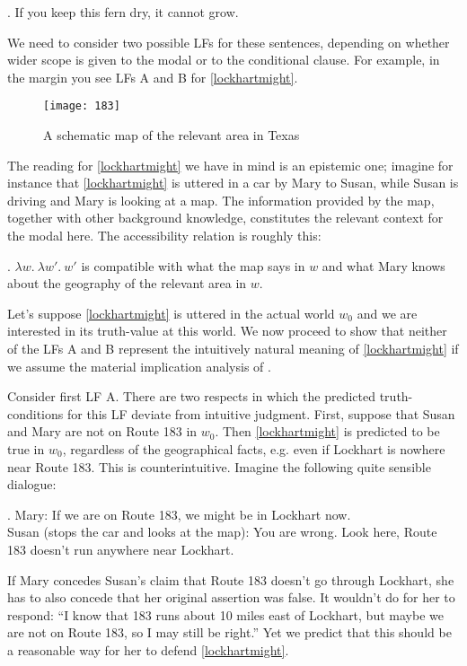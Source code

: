 \ex. \label{fern}If you keep this fern dry, it cannot grow.

We need to consider two possible LFs for these sentences, depending on whether wider scope is given to the modal or to the conditional clause. For example, in the margin you see LFs A and B for \ref{lockhartmight}.

\begin{wrapfigure}{l}{40mm}
  \begin{center}
    \texttt{[image: 183]}
  \end{center}
  \caption{A schematic map of the relevant area in Texas}
\end{wrapfigure}
%
The reading for \ref{lockhartmight} we have in mind is an epistemic one; imagine for instance that \ref{lockhartmight} is uttered in a car by Mary to Susan, while Susan is driving and Mary is looking at a map. The information provided by the map, together with other background knowledge, constitutes the relevant context for the modal  here. The accessibility relation is roughly this:

\ex. $\lambda w.\ \lambda w'.\ w'$ is compatible with what the map says in $w$ and what Mary knows about the geography of the relevant area in $w$.

Let's suppose \ref{lockhartmight} is uttered in the actual world $w_0$ and we are interested in its truth-value at this world. We now proceed to show that neither of the LFs A and B represent the intuitively natural meaning of \ref{lockhartmight} if we assume the material implication analysis of .

Consider first LF A. There are two respects in which the predicted truth-conditions for this LF deviate from intuitive judgment. First, suppose that Susan and Mary are not on Route 183 in $w_0$. Then \ref{lockhartmight} is predicted to be true in $w_0$, regardless of the geographical facts, e.g. even if Lockhart is nowhere near Route 183. This is counterintuitive. Imagine the following quite sensible dialogue:

\ex. Mary: If we are on Route 183, we might be in Lockhart now.\\
Susan (stops the car and looks at the map): You are wrong. Look here, Route 183 doesn't run anywhere near Lockhart.

If Mary concedes Susan's claim that Route 183 doesn't go through Lockhart, she has to also concede that her original assertion was false. It wouldn't do for her to respond: ``I know that 183 runs about 10 miles east of Lockhart, but maybe we are not on Route 183, so I may still be right.'' Yet we predict that this should be a reasonable way for her to defend \ref{lockhartmight}.

